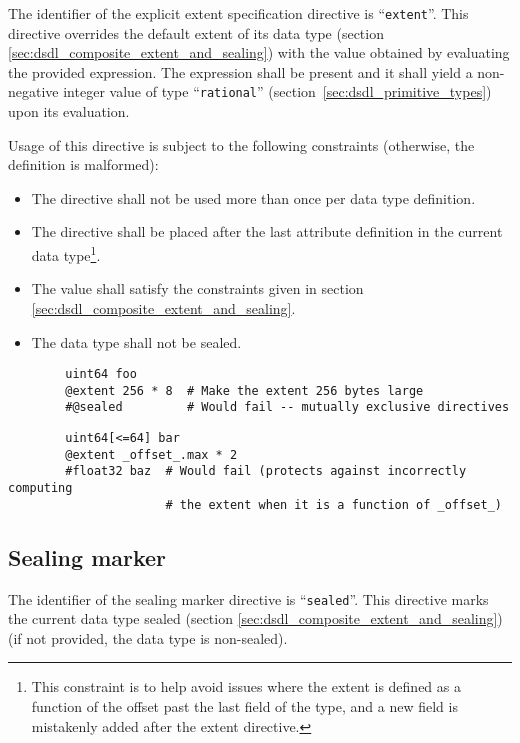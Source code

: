 The identifier of the explicit extent specification directive is ``\verb|extent|''.
This directive overrides the default extent of its data type (section \ref{sec:dsdl_composite_extent_and_sealing})
with the value obtained by evaluating the provided expression.
The expression shall be present and it shall yield a non-negative integer value of type
``\verb|rational|'' (section~\ref{sec:dsdl_primitive_types}) upon its evaluation.

Usage of this directive is subject to the following constraints (otherwise, the definition is malformed):
\begin{itemize}
    \item The directive shall not be used more than once per data type definition.
    \item The directive shall be placed after the last attribute definition in the current data type\footnote{%
              This constraint is to help avoid issues where the extent is defined as a function of the offset past
              the last field of the type, and a new field is mistakenly added after the extent directive.
          }.
    \item The value shall satisfy the constraints given in section \ref{sec:dsdl_composite_extent_and_sealing}.
    \item The data type shall not be sealed.
\end{itemize}

\begin{remark}
    \begin{verbatim}
        uint64 foo
        @extent 256 * 8  # Make the extent 256 bytes large
        #@sealed         # Would fail -- mutually exclusive directives
    \end{verbatim}

    \begin{verbatim}
        uint64[<=64] bar
        @extent _offset_.max * 2
        #float32 baz  # Would fail (protects against incorrectly computing
                      # the extent when it is a function of _offset_)
    \end{verbatim}
\end{remark}

\subsection{Sealing marker}\label{sec:dsdl_directive_sealing}

The identifier of the sealing marker directive is ``\verb|sealed|''.
This directive marks the current data type sealed (section \ref{sec:dsdl_composite_extent_and_sealing})
(if not provided, the data type is non-sealed).

